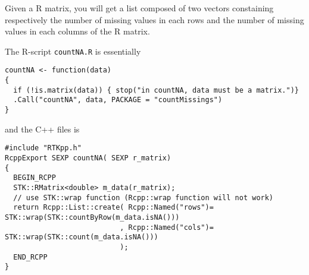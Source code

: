 \documentclass[a4paper,10pt]{article}
\begin{document}
Given a R matrix, you will get a list composed of two vectors
constaining respectively the number of missing values in each rows and the
number of missing values in each columns of the R matrix.

The R-script \texttt{countNA.R} is essentially
\begin{lstlisting}[style=customcpp]
countNA <- function(data)
{
  if (!is.matrix(data)) { stop("in countNA, data must be a matrix.")}
  .Call("countNA", data, PACKAGE = "countMissings")
}
\end{lstlisting}
and the C++ files is
\begin{lstlisting}[style=customcpp]
#include "RTKpp.h"
RcppExport SEXP countNA( SEXP r_matrix)
{
  BEGIN_RCPP
  STK::RMatrix<double> m_data(r_matrix);
  // use STK::wrap function (Rcpp::wrap function will not work)
  return Rcpp::List::create( Rcpp::Named("rows")= STK::wrap(STK::countByRow(m_data.isNA()))
                           , Rcpp::Named("cols")= STK::wrap(STK::count(m_data.isNA()))
                           );
  END_RCPP
}
\end{lstlisting}




\end{document}
